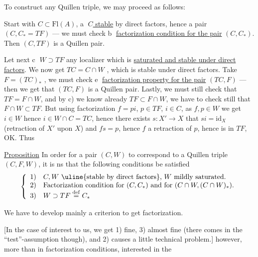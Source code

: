 
To construct any Quillen triple, we may proceed as follows:

Start with  $C\subset\mathrm{Fl}(A)$, \textcircled{a} \uline{$C$ stable} by direct factors, hence a pair $(C,C_*=TF)$ --- we must check \textcircled{b} \uline{factorization condition for the pair} $(C,C_*)$.  Then $(C,TF)$ is a Quillen pair.

Let next \textcircled{c} $\boxed{W\supset TF}$ any localizer which is  \uline{saturated and stable under direct factors}. We now get $TC=C\cap W$ , which is  stable under direct factors. Take $F=(TC)_*$ , we must check \textcircled{e} \uline{factorization property for the pair} $(TC,F)$ --- then we get that $(TC,F)$ is a Quillen pair. Lastly, we must still check that $TF=F\cap W$, and by c) we know already $TF\subset F\cap W$, we have to check still that $F\cap W\subset TF$. But using factorization $f=pi$, $p\in TF$, $i\in C$, as $f,p\in W$ we get $i\in W$ hence $i\in W\cap C=TC$, hence there exists $s:X'\to X$  that $si=\mathrm{id}_X$ (retraction of $X'$ upon $X$) and $fs=p$, hence $f$ a retraction of $p$, hence is in $TF$, OK. Thus



\uline{Proposition} In order for a pair $(C,W)$ to correspond to a Quillen triple $(C,F,W)$, it is ns that the following conditions be satisfied
\[
\left\{\begin{array}{ll}
1)&C,W\text{ \uline{stable by direct factors}, }W\text{ mildly saturated}.\\
2)&\text{Factorization condition for }(C,C_*)\text{ and for }(C\cap W,(C\cap W)_*).\\
3)&W\supset TF\overset{\mathrm{def}}{=}C_*
\end{array}\right.
\]

We have to develop mainly a criterion to get factorization.

[In the case of interest to us, we get 1) fine, 3) almost fine (there comes in the ``test''-assumption though), and 2) causes a little technical problem.]  however, more than in factorization conditions, interested in the


